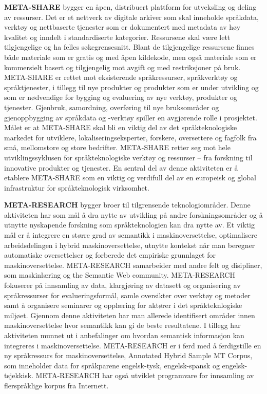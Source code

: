 \begin{multicols}{2}
\textbf{META-SHARE} bygger en åpen, distribuert plattform for utveksling og deling av ressurser. Det er et nettverk av digitale arkiver som skal inneholde språkdata, verktøy og nettbaserte tjenester som er dokumentert med metadata av høy kvalitet og inndelt i standardiserte kategorier. Ressursene skal være lett tilgjengelige og ha felles søkegrensesnitt. Blant de tilgjengelige ressursene finnes både materiale som er gratis og med åpen kildekode, men også  materiale som er kommersielt basert og tilgjengelig mot avgift og med restriksjoner på bruk. META-SHARE er rettet mot eksisterende språkressurser, språkverktøy og språktjenester, i tillegg til nye produkter og produkter som er under utvikling og som er nødvendige for bygging og evaluering av nye verktøy, produkter og tjenester. Gjenbruk, samordning, overføring til nye bruksområder og gjenoppbygging av språkdata og -verktøy spiller en avgjørende rolle i prosjektet. Målet er at META-SHARE skal bli en viktig del av det språkteknologiske markedet for utviklere, lokaliseringseksperter, forskere, oversettere og fagfolk fra små, mellomstore og store bedrifter. META-SHARE retter seg mot hele utviklingssyklusen for språkteknologiske verktøy og ressurser -- fra forskning til innovative produkter og tjenester. En sentral del av denne aktiviteten er å etablere META-SHARE som en viktig og verdifull del av en europeisk og global infrastruktur for språkteknologisk virksomhet. 

\textbf{META-RESEARCH} bygger broer til tilgrensende teknologiområder. Denne aktiviteten har som mål å dra nytte av utvikling på andre forskningsområder og å utnytte nyskapende forskning som språkteknologien kan dra nytte av. Et viktig mål er å integrere en større grad av semantikk i maskinoversettelse, optimalisere arbeidsdelingen i hybrid maskinoversettelse, utnytte kontekst når man beregner automatiske oversettelser og forberede det empiriske grunnlaget for maskinoversettelse. META-RESEARCH samarbeider med andre felt og disipliner, som maskinlæring og  the Semantic Web community. META-RESEARCH fokuserer på innsamling av data, klargjøring av datasett og organisering av språkressurser for evalueringsformål, samle oversikter over verktøy og metoder samt å organisere seminarer og opplæring for aktører i det språkteknlogiske miljøet. Gjennom denne aktiviteten har man allerede identifisert områder innen maskinoversettelse hvor semantikk kan gi de beste resultatene. I tillegg har aktiviteten munnet ut i anbefalinger om hvordan semantisk informasjon kan integreres i maskinoversettelse. META-RESEARCH er i ferd med å ferdigstille en ny språkressurs for maskinoversettelse,  Annotated Hybrid Sample MT Corpus, som inneholder data for språkparene engelsk-tysk, engelsk-spansk og engelsk-tsjekkisk. META-RESEARCH har også utviklet programvare for innsamling av flerspråklige korpus fra Internett.
\end{multicols}